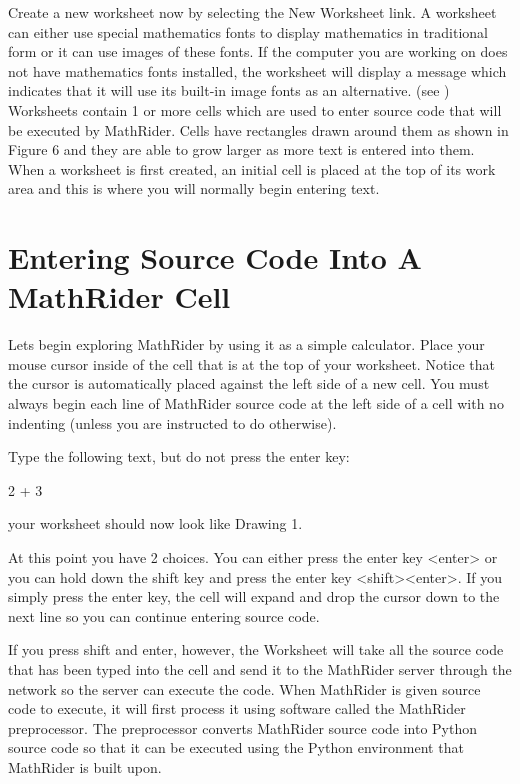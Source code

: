 \documentclass[12pt,oneside]{book}
\begin{document}
Create a new worksheet now by selecting the New Worksheet link. A worksheet can either use special mathematics fonts to display mathematics in traditional form or it can use images of these fonts. If the computer you are working on does not have mathematics fonts installed, the worksheet will display a message which indicates that it will use its built{}-in image fonts as an alternative. (see )  
Worksheets contain 1 or more cells which are used to enter source code that will be executed by MathRider. Cells have rectangles drawn around them as shown in Figure 6 and they are able to grow larger as more text is entered into them. When a worksheet is first created, an initial cell is placed at the top of its work area and this is where you will normally begin entering text.

\section[Entering Source Code Into A MathRider Cell]{Entering Source Code Into A MathRider Cell}

Lets begin exploring MathRider by using it as a simple calculator. Place your mouse cursor inside of the cell that is at the top of your worksheet. Notice that the cursor is automatically placed against the left side of a new cell. You must always begin each line of MathRider source code at the left side of a cell with no indenting (unless you are instructed to do otherwise). 

Type the following text, but do not press the enter key:


2 + 3


your worksheet should now look like Drawing 1.

At this point you have 2 choices. You can either press the enter key {\textless}enter{\textgreater} or you can hold down the shift key and press the enter key {\textless}shift{\textgreater}{\textless}enter{\textgreater}. If you simply press the enter key, the cell will expand and drop the cursor down to the next line so you can continue entering source code. 

If you press shift and enter, however, the Worksheet will take all the source code that has been typed into the cell and send it to the MathRider server through the network so the server can execute the code. When MathRider is given source code to execute, it will first process it using software called the MathRider preprocessor. The preprocessor converts MathRider source code into Python source code so that it can be executed using the Python environment that MathRider is built upon. 
\end{document}
